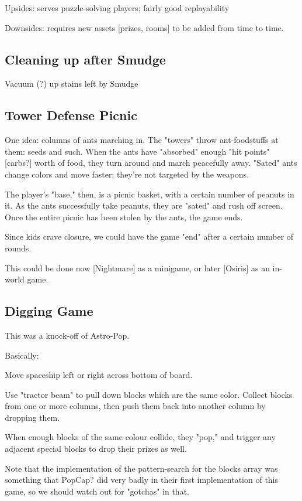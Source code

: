 \documentclass[11pt]{article}
\begin{document}
Upsides: serves puzzle-solving players; fairly good replayability

Downsides: requires new assets [prizes, rooms] to be added from time
to time.
\subsection{Cleaning up after Smudge}
\label{sec-3-4}

Vacuum (?) up stains left by Smudge
\subsection{Tower Defense Picnic}
\label{sec-3-5}

One idea: columns of ants marching in. The "towers" throw
ant-foodstuffs at them: seeds and such. When the ants have "absorbed"
enough "hit points" [carbs?] worth of food, they turn around and
march peacefully away. "Sated" ants change colors and move faster;
they're not targeted by the weapons.

The player's "base," then, is a picnic basket, with a certain number
of peanuts in it. As the ants successfully take peanuts, they are
"sated" and rush off screen. Once the entire picnic has been stolen
by the ants, the game ends.

Since kids crave closure, we could have the game "end" after a
certain number of rounds.

This could be done now [Nightmare] as a minigame, or later [Osiris]
as an in-world game. 
\subsection{Digging Game}
\label{sec-3-6}

This was a knock-off of Astro-Pop.

Basically:

Move spaceship left or right across bottom of board.

Use "tractor beam" to pull down blocks which are the same
color. Collect blocks from one or more columns, then push them back
into another column by dropping them.

When enough blocks of the same colour collide, they "pop," and trigger
any adjacent special blocks to drop their prizes as well.

Note that the implementation of the pattern-search for the blocks
array was something that PopCap? did very badly in their first
implementation of this game, so we should watch out for "gotchas"
in that.
\end{document}
